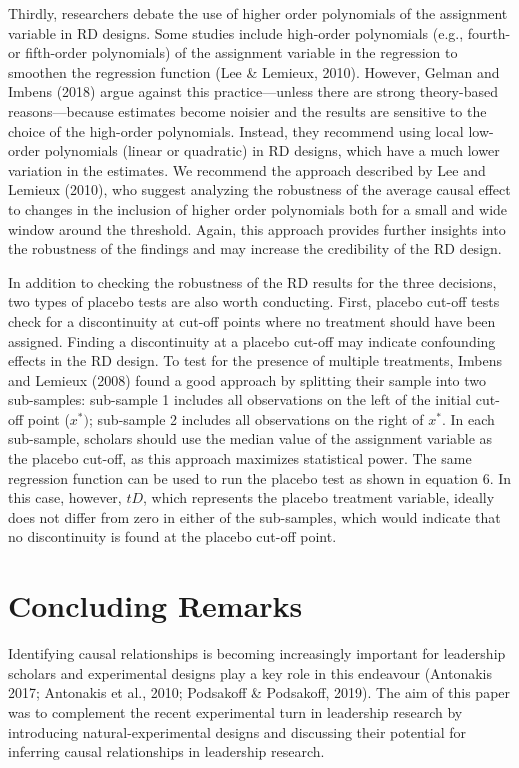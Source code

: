 \documentclass[english]{article}
\begin{document}
Thirdly, researchers debate the use of higher order polynomials of the
assignment variable in RD designs. Some studies include high-order
polynomials (e.g., fourth- or fifth-order polynomials) of the assignment
variable in the regression to smoothen the regression function (Lee \&
Lemieux, 2010). However, Gelman and Imbens (2018) argue against this
practice---unless there are strong theory-based reasons---because
estimates become noisier and the results are sensitive to the choice of
the high-order polynomials. Instead, they recommend using local
low-order polynomials (linear or quadratic) in RD designs, which have a
much lower variation in the estimates. We recommend the approach
described by Lee and Lemieux (2010), who suggest analyzing the
robustness of the average causal effect to changes in the inclusion of
higher order polynomials both for a small and wide window around the
threshold. Again, this approach provides further insights into the
robustness of the findings and may increase the credibility of the RD
design.

In addition to checking the robustness of the RD results for the three
decisions, two types of placebo tests are also worth conducting. First,
placebo cut-off tests check for a discontinuity at cut-off points where
no treatment should have been assigned. Finding a discontinuity at a
placebo cut-off may indicate confounding effects in the RD design. To
test for the presence of multiple treatments, Imbens and Lemieux (2008)
found a good approach by splitting their sample into two sub-samples:
sub-sample 1 includes all observations on the left of the initial
cut-off point (\(x^{*})\); sub-sample 2 includes all observations on the
right of \(x^{*}\). In each sub-sample, scholars should use the median
value of the assignment variable as the placebo cut-off, as this
approach maximizes statistical power. The same regression function can
be used to run the placebo test as shown in equation 6. In this case,
however, $tD$, which represents the placebo treatment variable,
ideally does not differ from zero in either of the sub-samples, which
would indicate that no discontinuity is found at the placebo cut-off
point.
 
\section{Concluding Remarks} 

\noindent Identifying causal relationships is becoming increasingly important for
leadership scholars and experimental designs play a key role in this
endeavour (Antonakis 2017; Antonakis et al., 2010; Podsakoff \&
Podsakoff, 2019). The aim of this paper was to complement the recent
experimental turn in leadership research by introducing
natural-experimental designs and discussing their potential for
inferring causal relationships in leadership research.
\end{document}
